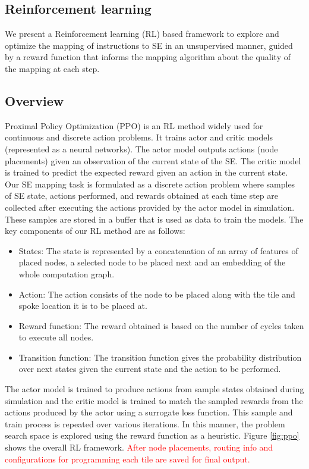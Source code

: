 \subsection{Reinforcement learning}

We present a Reinforcement learning (RL) based framework to explore and optimize the mapping of instructions to SE in an unsupervised manner, guided by a reward function that informs the mapping algorithm about the quality of the mapping at each step. 

\subsection{Overview}
Proximal Policy Optimization (PPO) is an RL method widely used for continuous and discrete action problems. It trains actor and critic models (represented as a neural networks). 
The actor model outputs actions (node placements) given an observation of the current state of the SE. The critic model is trained to predict the expected reward given an action in the current state. 
Our SE mapping task is formulated as a discrete action problem where samples of SE state, actions performed, and rewards obtained at each time step are collected after executing the actions provided by the actor model in simulation. These samples are stored in a buffer that is used as data to train the models. 
The key components of our RL method are as follows:
\begin{itemize}
  \item States: The state is represented by a concatenation of an array of features of placed nodes, a selected node to be placed next and an embedding of the whole computation graph. 
  \item Action: The action consists of the node to be placed along with the tile and spoke location it is to be placed at.
  \item Reward function: The reward obtained is based on the number of cycles taken to execute all nodes.
  \item Transition function: The transition function gives the probability distribution over next states given the current state and the action to be performed.
\end{itemize}


 The actor model is trained to produce actions from sample states obtained during simulation and the critic model is trained to match the sampled rewards from the actions produced by the actor using a surrogate loss function. This sample and train process is repeated over various iterations. In this manner, the problem search space is explored using the reward function as a heuristic.
Figure \ref{fig:ppo} shows the overall RL framework. 
\textcolor{red}{After node placements, routing info and configurations for programming each tile are saved for final output.}

